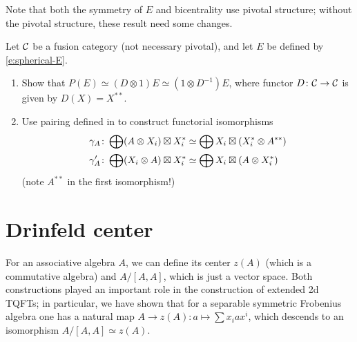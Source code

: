 Note that both the symmetry of $E$ and bicentrality use pivotal structure;
 without the pivotal structure, these result need some changes.
\begin{exercise}\label{ec:E-nonpivotal}
  Let  $\mathcal{C}$ be a fusion category (not necessary pivotal), and let $E$ be
  defined by \eqref{e:spherical-E}.
  \begin{enumerate}
    \item Show that $P(E)\simeq (D \otimes 1)E \simeq (1\otimes D^{-1})E$,
      where functor $D\colon  \mathcal{C}\to\mathcal{C}$ is given by $D(X)=X^{**}$.
    \item Use pairing defined in  to construct
      functorial isomorphisms
    \begin{align*}
      \gamma_A\colon \bigoplus (A\otimes X_i) \boxtimes X_i^* &\simeq
        \bigoplus X_i \boxtimes (X_i^* \otimes A^{**})\\
      \gamma'_A\colon \bigoplus (X_i\otimes A) \boxtimes X_i^* &\simeq
          \bigoplus X_i \boxtimes (A\otimes X_i^*)
    \end{align*}
    (note $A^{**}$ in the first isomorphism!)
  \end{enumerate}
\end{exercise}
\section{Drinfeld center}\label{s:drinfeld-center}
For an associative algebra $A$, we can define its center $z(A)$ (which is a
commutative algebra) and $A/[A,A]$, which is just a vector space. Both
constructions played an important role in the construction of extended 2d TQFTs; in
particular, we have shown that for a separable symmetric Frobenius algebra one
has a natural map $A\to z(A)\colon a\mapsto \sum x_iax^i$, which descends to an
isomorphism $A/[A,A]\simeq z(A)$.

